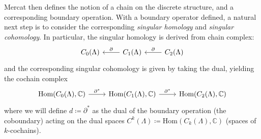 \documentclass[aps,pra,showpacs,notitlepage,onecolumn,superscriptaddress,nofootinbib]{revtex4-1}
\theoremstyle{definition}
\begin{document}
\noindent Mercat
then defines the notion of a chain on the discrete structure, and a corresponding boundary operation. With a boundary operator defined,
a natural next step is to consider the corresponding \emph{singular homology} and \emph{singular cohomology}. In particular, the singular homology
is derived from chain complex:
\[\begin{tikzcd}
	          {C_0(\Lambda)} & {C_1(\Lambda)} & {C_{2}(\Lambda)}
	          \arrow["\partial"', from=1-3, to=1-2]
	          \arrow["\partial"', from=1-2, to=1-1]
\end{tikzcd}\]
and the corresponding singular cohomology is given by taking the dual, yielding the cochain complex
\[\begin{tikzcd}
	          {\text{Hom}(C_0(\Lambda), \mathbb{C})} & {\text{Hom}(C_1(\Lambda), \mathbb{C})} & {\text{Hom}(C_2(\Lambda), \mathbb{C})}
	          \arrow["{\partial^{*}}", from=1-2, to=1-3]
	          \arrow["{\partial^{*}}", from=1-1, to=1-2]
\end{tikzcd}\]
where we will define $d \coloneqq \partial^{*}$ as the dual of the boundary operation (the coboundary) acting on the dual spaces $C^{k}(\Lambda) \coloneqq \text{Hom}(C_k(\Lambda), \mathbb{C})$ (spaces of $k$-cochains).
\end{document}
